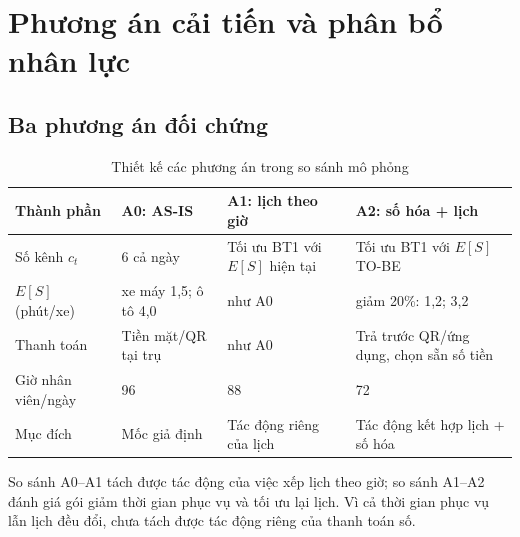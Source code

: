 
\section{Phương án cải tiến và phân bổ nhân lực}
\label{r3:tobe}
\subsection{Ba phương án đối chứng}
\begin{table}[htbp]\centering\small
\caption{Thiết kế các phương án trong so sánh mô phỏng}\label{r3:scenarios-design}
\begin{tabularx}{\linewidth}{@{}p{26mm}Y Y Y@{}}
\toprule
Thành phần & A0: AS-IS & A1: lịch theo giờ & A2: số hóa + lịch \\
\midrule
Số kênh $c_t$ & 6 cả ngày & Tối ưu BT1 với $E[S]$ hiện tại & Tối ưu BT1 với $E[S]$ TO-BE \\
$E[S]$ (phút/xe) & xe máy 1,5; ô tô 4,0 & như A0 & giảm 20\%: 1,2; 3,2 \\
Thanh toán & Tiền mặt/QR tại trụ & như A0 & Trả trước QR/ứng dụng, chọn sẵn số tiền \\
Giờ nhân viên/ngày & 96 & 88 & 72 \\
Mục đích & Mốc giả định & Tác động riêng của lịch & Tác động kết hợp lịch + số hóa \\
\bottomrule
\end{tabularx}
\end{table}
So sánh A0--A1 tách được tác động của việc xếp lịch theo giờ; so sánh A1--A2
đánh giá gói giảm thời gian phục vụ và tối ưu lại lịch. Vì cả thời gian phục
vụ lẫn lịch đều đổi, chưa tách được tác động riêng của thanh toán số.

